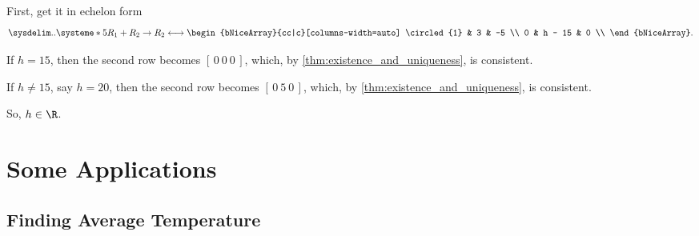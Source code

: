 \begin{solution}
  \label{sol:solve_for_h}

  First, get it in echelon form
  \[%
    \sysdelim..\systeme*{
      \-5R_1 + R_2 \rightarrow R_2
    } \longleftrightarrow
    \begin{bNiceArray}{cc|c}[columns-width=auto]
      \circled{1} & 3 & -5 \\
      0 & h - 15 & 0 \\
    \end{bNiceArray}
  .\]%

  \noindent If $h = 15$, then the second row becomes $[\,0~0~0\,]$, which, by
  \cref{thm:existence_and_uniqueness}, is consistent.

  \noindent If $h \ne 15$, say $h = 20$, then the second row becomes
  $[\,0~5~0\,]$, which, by \cref{thm:existence_and_uniqueness}, is consistent.

  \noindent So, $h \in \R$.
\end{solution}


\section{Some Applications}
\label{sec:some_applications}

\subsection{Finding Average Temperature}
\label{sub_sec:finding_average_temperature}

